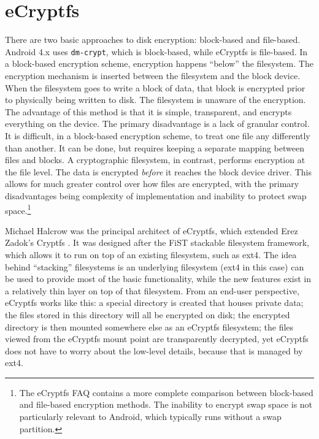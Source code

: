 \section{eCryptfs} 
\label{sec:ecryptfs}
There are two basic approaches to disk encryption: block-based and file-based. Android 4.x uses \texttt{dm-crypt}, which is
block-based, while eCryptfs is file-based.  In a block-based encryption scheme, encryption happens ``below'' the filesystem. The
encryption mechanism is inserted between the filesystem and the block device. When the filesystem goes to write a block of data,
that block is encrypted prior to physically being written to disk. The filesystem is unaware of the encryption. The advantage of
this method is that it is simple, transparent, and encrypts everything on the device. The primary disadvantage is a lack of granular
control. It is difficult, in a block-based encryption scheme, to treat one file any differently than another.  It can be done, but
requires keeping a separate mapping between files and blocks. A cryptographic filesystem, in contrast, performs encryption at the
file level. The data is encrypted \emph{before} it reaches the block device driver. This allows for much greater control over how
files are encrypted, with the primary disadvantages being complexity of implementation and inability to protect swap
space.\footnote{The eCryptfs FAQ contains a more complete comparison between block-based and file-based encryption methods. The
inability to encrypt swap space is not particularly relevant to Android, which typically runs without a swap partition.}

Michael Halcrow was the principal architect of eCryptfs, which extended Erez Zadok's Cryptfs \cite{Halcrow}. It was designed after
the FiST stackable filesystem framework, which allows it to run on top of an existing filesystem, such as ext4. The idea behind
``stacking'' filesystems is an underlying filesystem (ext4 in this case) can be used to provide most of the basic functionality,
while the new features exist in a relatively thin layer on top of that filesystem. From an end-user perspective, eCryptfs works like
this: a special directory is created that houses private data; the files stored in this directory will all be encrypted on disk;
the encrypted directory is then mounted somewhere else as an eCryptfs filesystem; the files viewed from the eCryptfs mount point are
transparently decrypted, yet eCryptfs does not have to worry about the low-level details, because that is managed by ext4. 

